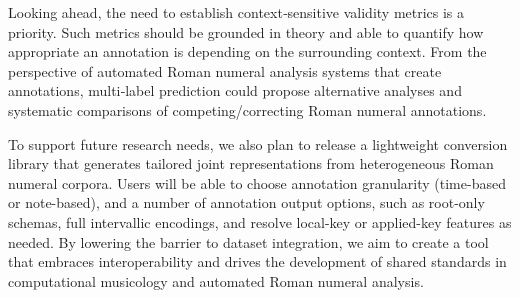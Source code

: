 \documentclass[sigconf]{acmart} %
\begin{document}
Looking ahead, the need to establish context‐sensitive validity metrics is a priority. Such metrics should be grounded in theory and able to quantify how appropriate an annotation is depending on the surrounding context. From the perspective of automated Roman numeral analysis systems that create annotations, multi‐label prediction could propose alternative analyses and systematic comparisons of competing/correcting Roman numeral annotations.

To support future research needs, we also plan to release a lightweight conversion library that generates tailored joint representations from heterogeneous Roman numeral corpora. Users will be able to choose annotation granularity (time-based or note-based), and a number of annotation output options, such as root-only schemas, full intervallic encodings, and resolve local-key or applied-key features as needed. By lowering the barrier to dataset integration, we aim to create a tool that embraces interoperability and drives the development of shared standards in computational musicology and automated Roman numeral analysis.







\printbibliography
\end{document}
